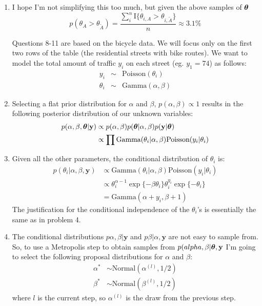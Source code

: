 \documentclass[12pt]{article}
\def\y{\mathbf{y}}
\newcommand{\bth}{\mbox{\boldmath $\theta$}}
\begin{document}
\begin{enumerate}
	
	\item I hope I'm not simplifying this too much, but given the above samples of $\bth$ \[
		p(\theta_A > \theta_{\tilde{A}}) = \dfrac{\sum_{i}^n \mathrm{I} \{\theta_{i,A} > \theta_{i,\tilde{A}}\}}{n} \approx 3.1\%
	\] 
	
	\vspace{.05cm} Questions 8-11 are based on the bicycle data. We will focus only on the first two rows of the table (the residential streets with bike routes). We want to model the total amount of traffic $y_i$ on each street (eg. $y_1=74$) as follows:
	\begin{eqnarray*}
		y_i & \sim & \mbox{Poisson}(\theta_i)\\
		\theta_i & \sim & \mbox{Gamma}(\alpha,\beta) 
	\end{eqnarray*}
	
	\item Selecting a flat prior distribution for $\alpha$ and $\beta$, $p(\alpha,\beta) \propto 1$ results in the following posterior distribution of our unknown variables: 
		\begin{align*}
			p(\alpha,\beta,\bth|\y) & \propto p(\alpha,\beta)p(\bth|\alpha,\beta) p(\y|\bth) \\
			& \propto \prod \mbox{Gamma} (\theta_i|\alpha,\beta) \mbox{Poisson}(y_i|\theta_i)
		\end{align*}
	
	\item Given all the other parameters, the conditional distribution of $\theta_i$ is:
	\begin{align*}
		p(\theta_i|\alpha, \beta ,\y) & \propto \mbox{Gamma} (\theta_i|\alpha,\beta) \mbox{Poisson}(y_i|\theta_i) \\
		& \propto \theta_i^{\alpha-1} \exp\{-\beta\theta_i\} \theta_i^{y_i} \exp \{ -\theta_i \} \\
		& = \mbox{Gamma} (\alpha + y_i,\beta + 1)
	\end{align*}
	The justification for the conditional independence of the $\theta_i$'s is essentially the same as in problem 4.
	
	\item The conditional distributions $p \alpha,\beta|\y$ and $p \beta|\alpha,\y$ are not easy to sample from. So, to use a Metropolis step to obtain samples from $p(alpha,\beta|\bth,\y$ I'm going to select the following proposal distributions for $\alpha$ and $\beta$:
	\begin{align*}
		\alpha^* & \sim \mbox{Normal}(\alpha^{(l)}, 1/2) \\
		\beta^* & \sim \mbox{Normal}(\beta^{(l)}, 1/2)
	\end{align*}
	where $l$ is the current step, so $\alpha^{(l)}$ is the draw from the previous step.
	

\end{enumerate}
\end{document}
